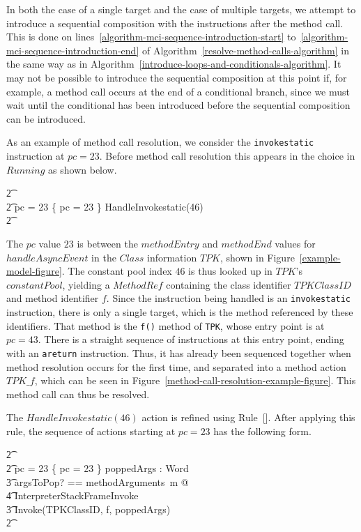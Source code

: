 In both the case of a single target and the case of multiple targets,
we attempt to introduce a sequential composition with the instructions
after the method call.
This is done on lines~\ref{algorithm-mci-sequence-introduction-start}
to~\ref{algorithm-mci-sequence-introduction-end} of
Algorithm~\ref{resolve-method-calls-algorithm} in the same way as in
Algorithm~\ref{introduce-loops-and-conditionals-algorithm}.
It may not be possible to introduce the sequential composition at this
point if, for example, a method call occurs at the end of a
conditional branch, since we must wait until the conditional has been
introduced before the sequential composition can be introduced.

As an example of method call resolution, we consider the
\texttt{invokestatic} instruction at $pc = 23$. 
Before method call resolution this appears in the choice in $Running$
as shown below.
\begin{circusaction}
  \t2 {} \cdots {} \\
  \t2 {} \circelse pc = 23 \circthen \{ pc = 23 \} \circseq HandleInvokestatic(46) \\
  \t2 {} \cdots {} \\
\end{circusaction}
The $pc$ value $23$ is between the $methodEntry$ and $methodEnd$
values for $handleAsyncEvent$ in the $Class$ information $TPK$, shown
in Figure~\ref{example-model-figure}.
The constant pool index $46$ is thus looked up in $TPK$'s
$constantPool$, yielding a $MethodRef$ containing the class identifier
$TPKClassID$ and method identifier $f$.
Since the instruction being handled is an \texttt{invokestatic}
instruction, there is only a single target, which is the method
referenced by these identifiers.
That method is the \texttt{f()} method of \texttt{TPK}, whose entry
point is at $pc = 43$.
There is a straight sequence of instructions at this entry point,
ending with an \texttt{areturn} instruction. 
Thus, it has already been sequenced together when method resolution
occurs for the first time, and separated into a method action
$TPK\_f$, which can be seen in
Figure~\ref{method-call-resolution-example-figure}.
This method call can thus be resolved.

The $HandleInvokestatic(46)$ action is refined using
Rule~[].
After applying this rule, the sequence of actions starting at
$pc = 23$ has the following form.
\begin{circusaction}
  \t2 {} \cdots {} \\
  \t2 {} \circelse pc = 23 \circthen \{ pc = 23 \} \circseq \circvar poppedArgs : \seq Word \circspot \\
  \t3 \lschexpract \exists argsToPop? == methodArguments~m @ \\
  \t4 InterpreterStackFrameInvoke \rschexpract \circseq \\
  \t3 Invoke(TPKClassID, f, poppedArgs) \\
  \t2 {} \cdots {}
\end{circusaction}

